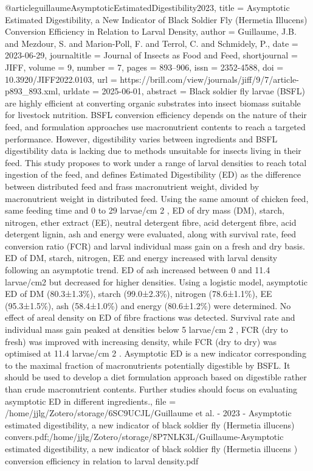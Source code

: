 {{{@article{guillaumeAsymptoticEstimatedDigestibility2023,
  title = {Asymptotic Estimated Digestibility, a New Indicator of Black Soldier Fly ({{Hermetia}} Illucens) Conversion Efficiency in Relation to Larval Density},
  author = {Guillaume, J.B. and Mezdour, S. and Marion-Poll, F. and Terrol, C. and Schmidely, P.},
  date = {2023-06-29},
  journaltitle = {Journal of Insects as Food and Feed},
  shortjournal = {JIFF},
  volume = {9},
  number = {7},
  pages = {893--906},
  issn = {2352-4588},
  doi = {10.3920/JIFF2022.0103},
  url = {https://brill.com/view/journals/jiff/9/7/article-p893_893.xml},
  urldate = {2025-06-01},
  abstract = {Black soldier fly larvae (BSFL) are highly efficient at converting organic substrates into insect biomass suitable for livestock nutrition. BSFL conversion efficiency depends on the nature of their feed, and formulation approaches use macronutrient contents to reach a targeted performance. However, digestibility varies between ingredients and BSFL digestibility data is lacking due to methods unsuitable for insects living in their feed. This study proposes to work under a range of larval densities to reach total ingestion of the feed, and defines Estimated Digestibility (ED) as the difference between distributed feed and frass macronutrient weight, divided by macronutrient weight in distributed feed. Using the same amount of chicken feed, same feeding time and 0 to 29 larvae/cm               2               , ED of dry mass (DM), starch, nitrogen, ether extract (EE), neutral detergent fibre, acid detergent fibre, acid detergent lignin, ash and energy were evaluated, along with survival rate, feed conversion ratio (FCR) and larval individual mass gain on a fresh and dry basis. ED of DM, starch, nitrogen, EE and energy increased with larval density following an asymptotic trend. ED of ash increased between 0 and 11.4 larvae/cm2 but decreased for higher densities. Using a logistic model, asymptotic ED of DM (80.3±1.3\%), starch (99.0±2.3\%), nitrogen (78.6±1.1\%), EE (95.3±1.5\%), ash (58.4±1.0\%) and energy (80.6±1.2\%) were determined. No effect of areal density on ED of fibre fractions was detected. Survival rate and individual mass gain peaked at densities below 5 larvae/cm               2               , FCR (dry to fresh) was improved with increasing density, while FCR (dry to dry) was optimised at 11.4 larvae/cm               2               . Asymptotic ED is a new indicator corresponding to the maximal fraction of macronutrients potentially digestible by BSFL. It should be used to develop a diet formulation approach based on digestible rather than crude macronutrient contents. Further studies should focus on evaluating asymptotic ED in different ingredients.},
  file = {/home/jjlg/Zotero/storage/6SC9UCJL/Guillaume et al. - 2023 - Asymptotic estimated digestibility, a new indicator of black soldier fly (Hermetia illucens) convers.pdf;/home/jjlg/Zotero/storage/8P7NLK3L/Guillaume-Asymptotic estimated digestibility, a new indicator of black soldier fly (Hermetia illucens ) conversion efficiency in relation to larval density.pdf}
}

}}}
